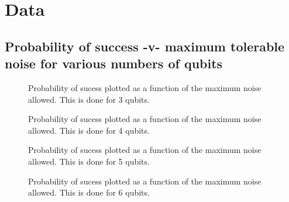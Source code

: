 \chapter{Data}
\label{chap:data}
%

\newlength{\dataheight}
\setlength{\dataheight}{3in}
\newlength{\datawidth}
\setlength{\datawidth}{4.5in}

\section{Probability of success -v- maximum tolerable noise for various
numbers of qubits}

\pagebreak


\begin{figure}[h]
\begin{center}
\end{center}
\caption{Probability of sucess plotted as a function of the maximum noise allowed.
This is done for 3 qubits.}
\end{figure}

\pagebreak

\begin{figure}[h]
\begin{center}
\end{center}
\caption{Probability of sucess plotted as a function of the maximum noise allowed.
This is done for 4 qubits.}
\end{figure}

\pagebreak

\begin{figure}[h]
\begin{center}
\end{center}
\caption{Probability of sucess plotted as a function of the maximum noise allowed.
This is done for 5 qubits.}
\end{figure}

\pagebreak

\begin{figure}[h]
\begin{center}
\end{center}
\caption{Probability of sucess plotted as a function of the maximum noise allowed.
This is done for 6 qubits.}
\end{figure}

